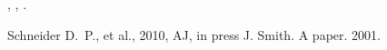\documentclass{article}
\begin{document}
\citet{s10}, \citet{a}, \citep{a}.
\begin{thebibliography}{}
 Schneider D.~P., et al., 2010, AJ, in press
 J. Smith. A paper. 2001.
\end{thebibliography}
\end{document}
